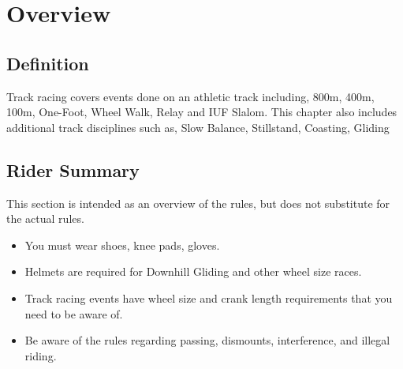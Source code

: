 \chapter{Overview}

\section{Definition}

Track racing covers events done on an athletic track including, 800m, 400m, 100m, One-Foot, Wheel Walk, Relay and IUF Slalom. This chapter also includes additional track disciplines such as, Slow Balance, Stillstand, Coasting, Gliding

\section{Rider Summary}

This section is intended as an overview of the rules, but does not substitute for the actual rules.
\begin{itemize}
\item You must wear shoes, knee pads, gloves.
\item Helmets are required for Downhill Gliding and other wheel size races.
\item Track racing events have wheel size and crank length requirements that you need to be aware of.
\item Be aware of the rules regarding passing, dismounts, interference, and illegal riding.
\end{itemize}
